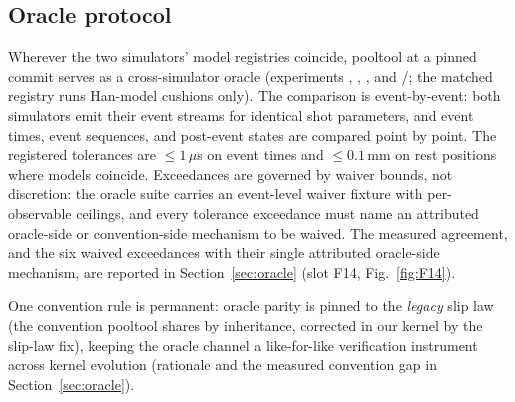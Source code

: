 \subsection{Oracle protocol}

Wherever the two simulators' model registries coincide, pooltool
\citep{kiefl2024pooltool} at a pinned commit serves as a cross-simulator
oracle (experiments , , , and
/; the matched registry runs Han-model cushions only).
The comparison is event-by-event: both simulators emit their event streams
for identical shot parameters, and event times, event sequences, and
post-event states are compared point by point. The registered tolerances are
$\leq 1\,\mu$s on event times and $\leq 0.1$\,mm on rest positions where
models coincide. Exceedances are governed by waiver bounds, not discretion:
the oracle suite carries an event-level waiver fixture with per-observable
ceilings, and every tolerance exceedance must name an attributed
oracle-side or convention-side mechanism to be waived. The measured
agreement, and the six waived exceedances with their single attributed
oracle-side mechanism, are reported in
Section~\ref{sec:oracle} (slot F14, Fig.~\ref{fig:F14}).

One convention rule is permanent: oracle parity is pinned to the
\emph{legacy} slip law (the convention pooltool shares by inheritance,
corrected in our kernel by the slip-law fix), keeping the oracle channel a
like-for-like verification instrument across kernel evolution
(rationale and the measured convention
gap in Section~\ref{sec:oracle}).
